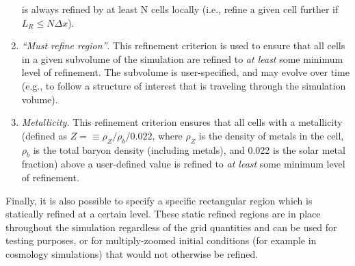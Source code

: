 \begin{enumerate}
is always refined by at least N cells locally (i.e., refine a given cell further if $L_R \leq N \Delta x$).

\item{\em ``Must refine region''}.  This refinement criterion is used to ensure that all cells in a given subvolume of the simulation are refined to {\it at least} some minimum level of refinement.  The subvolume is user-specified, and may evolve over time (e.g., to follow a structure of interest that is traveling through the simulation volume).

\item{\em Metallicity.}  This refinement criterion ensures that all cells with a metallicity (defined as $Z = \equiv \rho_{Z} / \rho_{b} / 0.022$, where $\rho_{Z}$ is the density of metals in the cell, $\rho_{b}$ is the total baryon density (including metals), and 0.022 is the solar metal fraction) above a user-defined value is refined to {\it at least} some minimum level of refinement. 

\end{enumerate}

Finally, it is also possible to specify a specific rectangular region which is statically refined at a certain level.  These static refined regions are in place throughout the simulation regardless of the grid quantities and can be used for testing purposes, or for multiply-zoomed initial conditions (for example in cosmology simulations) that would not otherwise be refined.

%

